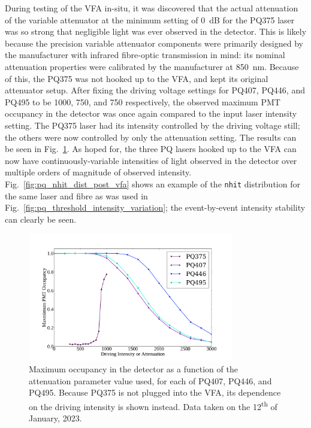 During testing of the VFA in-situ, it was discovered that the actual attenuation of the variable attenuator at the minimum setting of \SI{0}{\dB} for the PQ375 laser was so strong that negligible light was ever observed in the detector. This is likely because the precision variable attenuator components were primarily designed by the manufacturer with infrared fibre-optic transmission in mind: its nominal attenuation properties were calibrated by the manufacturer at \SI{850}{\nm}. Because of this, the PQ375 was not hooked up to the VFA, and kept its original attenuator setup. After fixing the driving voltage settings for PQ407, PQ446, and PQ495 to be 1000, 750, and 750 respectively, %
the observed maximum PMT occupancy in the detector was once again compared to the input laser intensity setting. The PQ375 laser had its intensity controlled by the driving voltage still; the others were now controlled by only the attenuation setting. The results can be seen in Fig.~\ref{fig:pq_new_intensity_dependence}. As hoped for, the three PQ lasers hooked up to the VFA can now have continuously-variable intensities of light observed in the detector over multiple orders of magnitude of observed intensity. Fig.~\ref{fig:pq_nhit_dist_post_vfa} shows an example of the \texttt{nhit} distribution for the same laser and fibre as was used in Fig.~\ref{fig:pq_threshold_intensity_variation}; the event-by-event intensity stability can clearly be seen.

\begin{figure}
    \centering
    \includegraphics[width=0.8\textwidth]{3_SMELLIEHardware/images/smellie_intensity_scan_new.pdf}
    \caption[Maximum occupancy in the detector as a function of the attenuation parameter value used]
    {Maximum occupancy in the detector as a function of the attenuation parameter value used, for each of PQ407, PQ446, and PQ495. Because PQ375 is not plugged into the VFA, its dependence on the driving intensity is shown instead. Data taken on the 12\textsuperscript{th} of January, 2023.}
    \label{fig:pq_new_intensity_dependence}
\end{figure}

